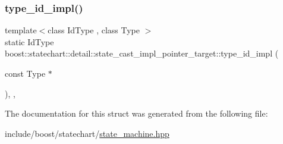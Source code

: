 \subsubsection{\texorpdfstring{type\+\_\+id\+\_\+impl()}{type\_id\_impl()}}
{\footnotesize\ttfamily template$<$class Id\+Type , class Type $>$ \\
static Id\+Type boost\+::statechart\+::detail\+::state\+\_\+cast\+\_\+impl\+\_\+pointer\+\_\+target\+::type\+\_\+id\+\_\+impl (\begin{DoxyParamCaption}\item[{const Type $\ast$}]{ }\end{DoxyParamCaption})\hspace{0.3cm}{\ttfamily [inline]}, {\ttfamily [static]}, {\ttfamily [private]}}



The documentation for this struct was generated from the following file\+:\begin{DoxyCompactItemize}
\item 
include/boost/statechart/\mbox{\hyperlink{state__machine_8hpp}{state\+\_\+machine.\+hpp}}\end{DoxyCompactItemize}
